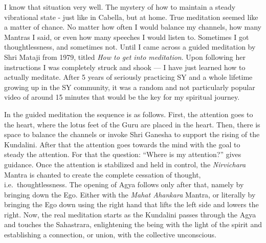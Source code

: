 \documentclass[12pt]{article}
\begin{document}


I know that situation very well.
The mystery of how to maintain a steady vibrational state - just like in Cabella, but at home.
True meditation seemed like a matter of chance.
No matter how often I would balance my channels, how many Mantras I said, or even how many speeches I would listen to.
Sometimes I got thoughtlessness, and sometimes not.
Until I came across a guided meditation by Shri Mataji from 1979, titled \textit{How to get into meditation}.
Upon following her instructions I was completely struck and shook --- I have just learned how to actually meditate.
After 5 years of seriously practicing SY and a whole lifetime growing up in the SY community, it was a random and not particularly popular video of around 15 minutes
that would be the key for my spiritual journey.



In the guided meditation the sequence is as follows.
First, the attention goes to the heart, where the lotus feet of the Guru are placed in the heart.
Then, there is space to balance the channels or invoke Shri Ganesha to support the rising of the Kundalini.
After that the attention goes towards the mind with the goal to steady the attention.
For that the question: ``Where is my attention?'' gives guidance.
Once the attention is stabilized and held in control, the \textit{Nirvichara} Mantra is chanted to create the complete cessation of thought, i.e.\ thoughtlessness.
The opening of Agya follows only after that, namely by bringing down the Ego.
Either with the \textit{Mahat Ahankara} Mantra, or literally by bringing the Ego down using the right hand that lifts the left side and lowers the right.
Now, the real meditation starts as the Kundalini passes through the Agya and touches the Sahastrara, enlightening the being with the light of the spirit and
establishing a connection, or union, with the collective unconscious.
\end{document}
